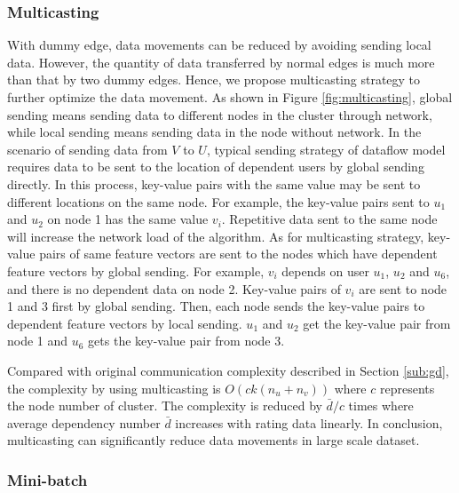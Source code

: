 \documentclass{llncs}
\begin{document}
\subsubsection{Multicasting}
With dummy edge, data movements can be reduced by avoiding sending local data. However, the quantity of data transferred by normal edges is much more than that by two dummy edges. Hence, we propose multicasting strategy to further optimize the data movement. As shown in Figure \ref{fig:multicasting}, global sending means sending data to different nodes in the cluster through network, while local sending means sending data in the node without network. In the scenario of sending data from $V$ to $U$, typical sending strategy of dataflow model requires data to be sent to the location of dependent users by global sending directly. In this process, key-value pairs with the same value may be sent to different locations on the same node. For example, the key-value pairs sent to $u_1$ and $u_2$ on node 1 has the same value $v_i$. Repetitive data sent to the same node will increase the network load of the algorithm. As for multicasting strategy, key-value pairs of same feature vectors are sent to the nodes which have dependent feature vectors by global sending. For example, $v_i$ depends on user $u_1$, $u_2$ and $u_6$, and there is no dependent data on node 2. Key-value pairs of $v_i$ are sent to node 1 and 3 first by global sending. Then, each node sends the key-value pairs to dependent feature vectors by local sending. $u_1$ and $u_2$ get the key-value pair from node 1 and $u_6$ gets the key-value pair from node 3.

Compared with original communication complexity described in Section \ref{sub:gd}, the complexity by using multicasting is $O(ck(n_u + n_v))$ where $c$ represents the node number of cluster. The complexity is reduced by $\bar{d}/c$ times where average dependency number $\bar{d}$ increases with rating data linearly. In conclusion, multicasting can significantly reduce data movements in large scale dataset.
\vspace{-15pt}
\subsubsection{Mini-batch}
\end{document}
